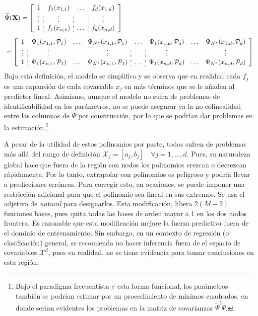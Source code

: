 \documentclass[../Main/Main.tex]{subfiles}
\begin{document}
\begin{align}
&\widetilde{\Psi}(\xmat) = 
\left[
\begin{array}{c:c:c:c}
1 & f_1(x_{1,1}) & \ldots & f_d(x_{1,d}) \\
\vdots & \vdots & ~ & \vdots \\
1 & f_1(x_{n,1}) & \ldots & f_d(x_{n,d}) 
\end{array} 
\right] \label{ec:PsiTilde}\\[5pt]
&=
\left[
\begin{array}{c:ccc:c:ccc}
1 & \Psi_1(x_{1,1},\P_1) & \ldots & \Psi_{\N}(x_{1,1},\P_1) & \ldots & \Psi_1(x_{1,d},\P_d) & \ldots & \Psi_{\N}(x_{1,d},\P_d)\\
\vdots & \vdots & ~ & \vdots & ~ & \vdots & ~ & \vdots \\
1 & \Psi_1(x_{n,1},\P_1) & \ldots & \Psi_{\N}(x_{n,1},\P_1) & \ldots & \Psi_1(x_{n,d},\P_d) & \ldots & \Psi_{\N}(x_{n,d},\P_d)
\end{array}
\right]\nonumber
\end{align}
Bajo esta definición, el modelo se simplifica y se observa que en realidad cada $f_j$ es una expansión de cada covariable $x_j$ en más términos que se le añaden al predictor lineal. Asimismo, aunque el modelo no sufra de problemas de identificabilidad en los parámetros, no se puede asegurar ya la no-colinealidad entre las columnas de $\widetilde{\Psi}$ por construcción, por lo que se podrían dar problemas en la estimación.\footnote{Bajo el paradigma frecuentista y esta forma funcional, los parámetros también se podrían estimar por un procedimiento de mínimos cuadrados, en donde serían evidentes los problemas en la matriz de covarianzas $\widetilde\Psi^t\widetilde\Psi$.}

A pesar de la utilidad de estos polinomios por parte, todos sufren de problemas más allá del rango de definición $\mathcal{X}_j = [a_j,b_j] \quad \forall j = 1,\ldots,d$. Pues, su naturaleza global hace que fuera de la región con nodos los polinomios crezcan o decrezcan rápidamente. Por lo tanto, extrapolar con polinomios es peligroso y podría llevar a predicciones erróneas. Para corregir esto, en ocasiones, se puede imponer una restricción adicional para que el polinomio sea lineal en sus extremos. Se usa el adjetivo de \textit{natural} para designarlos. Esta modificación, libera $2(M-2)$ funciones bases, pues quita todas las bases de orden mayor a 1 en los dos nodos frontera. Es razonable que esta modificación mejore la fuerza predictiva fuera de el dominio de entrenamiento. Sin embargo, en un contexto de regresión (o clasificación) general, se recomienda no hacer inferencia fuera de el espacio de covariables $\mathcal{X}^d$, pues en realidad, no se tiene evidencia para tomar conclusiones en esta región.
\end{document}
